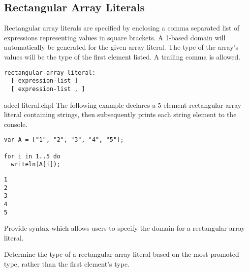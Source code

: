 \subsection{Rectangular Array Literals}
\label{Rectangular_Array_Literals}

Rectangular array literals are specified by enclosing a comma separated list of 
expressions representing values in square brackets. A 1-based domain will 
automatically be generated for the given array literal.  The type of the array's 
values will be the type of the first element listed. A trailing comma is
allowed.

\begin{syntax}
\begin{verbatim}
rectangular-array-literal:
  [ expression-list ]
  [ expression-list , ]
\end{verbatim}
\end{syntax}

\begin{chapelexample}{adecl-literal.chpl}
The following example declares a 5 element rectangular array literal 
containing strings, then subsequently prints each string element to the console.
\begin{chapel}
\begin{verbatim}
var A = ["1", "2", "3", "4", "5"];

for i in 1..5 do
  writeln(A[i]);
\end{verbatim}
\end{chapel}
\begin{chapeloutput}
\begin{verbatim}
1
2
3
4
5
\end{verbatim}
\end{chapeloutput}
\end{chapelexample}

\begin{future}
Provide syntax which allows users to specify the domain for a rectangular 
array literal.
\end{future}

\begin{future}
Determine the type of a rectangular array literal based on the most promoted 
type, rather than the first element's type.
\end{future}

